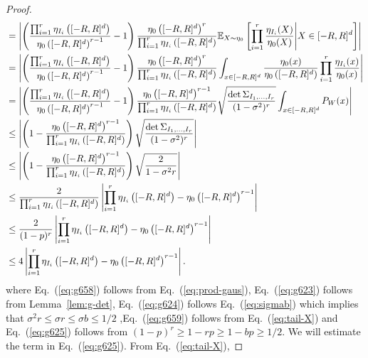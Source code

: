 \documentclass[final, 12pt]{colt2018}
\renewcommand{\eqref}[1]{Eq.~(\ref{#1})}
\begin{document}
\begin{proof}
\begin{align}
&= \left\lvert \left( \frac{\prod_{i=1}^r \eta_{I_i}\left([-R,R]^d\right)}{\eta_0\left([-R,R]^d\right)^{r-1}}-1 \right) 
\frac{\eta_0\left([-R,R]^d\right)^r}{\prod_{i=1}^r \eta_{I_i}\left([-R,R]^d\right)}
\mathbb{E}_{X\sim \eta_0}\left[ \prod_{i=1}^r \frac{\eta_{I_i}(X)}{\eta_0(X)} \middle| X \in [-R,R]^d \right] \right\rvert \notag\\
&= \left\lvert \left( \frac{\prod_{i=1}^r \eta_{I_i}\left([-R,R]^d\right)}{\eta_0\left([-R,R]^d\right)^{r-1}}-1 \right) 
\frac{\eta_0\left([-R,R]^d\right)^r}{\prod_{i=1}^r \eta_{I_i}\left([-R,R]^d\right)}
\int_{x \in [-R,R]^d} \frac{\eta_0(x)}{\eta_0\left([-R,R]^d\right)} \prod_{i=1}^r \frac{\eta_{I_i}(x)}{\eta_0(x)} \right\rvert \notag\\
&= \left\lvert \left( \frac{\prod_{i=1}^r \eta_{I_i}\left([-R,R]^d\right)}{\eta_0\left([-R,R]^d\right)^{r-1}}-1 \right) 
\frac{\eta_0\left([-R,R]^d\right)^{r-1}}{\prod_{i=1}^r \eta_{I_i}\left([-R,R]^d\right)}
\sqrt{\frac{\det \Sigma_{I_1, \dots, I_r}}{(1-\sigma^2)^r}} 
\int_{x \in [-R,R]^d} P_W(x) \right\rvert \label{eq:g658}\\
&\le\left\lvert\left(1 - \frac{\eta_0\left([-R,R]^d\right)^{r-1}}{\prod_{i=1}^r \eta_{I_i}\left([-R,R]^d\right)} \right)
\sqrt{\frac{\det \Sigma_{I_1, \dots, I_r}}{(1-\sigma^2)^r}} \right\rvert \notag\\
&\le\left\lvert\left(1 - \frac{\eta_0\left([-R,R]^d\right)^{r-1}}{\prod_{i=1}^r \eta_{I_i}\left([-R,R]^d\right)} \right)
\sqrt{\frac{2}{1-\sigma^2 r}}
\right\rvert \label{eq:g623} \\
&\le\frac{2}{\prod_{i=1}^r \eta_{I_i}\left([-R,R]^d\right)} \left\lvert \prod_{i=1}^r \eta_{I_i}\left([-R,R]^d\right) - \eta_0\left([-R,R]^d\right)^{r-1} \right\rvert
\label{eq:g624} \\
&\le \frac{2}{(1-p)^r} \left\lvert \prod_{i=1}^r \eta_{I_i}\left([-R,R]^d\right) - \eta_0\left([-R,R]^d\right)^{r-1} \right\rvert \label{eq:g659}\\
&\le 4 \left\lvert \prod_{i=1}^r \eta_{I_i}\left([-R,R]^d\right) - \eta_0\left([-R,R]^d\right)^{r-1} \right\rvert
\label{eq:g625}.
\end{align}
where \eqref{eq:g658} follows from \eqref{eq:prod-gaus}, \eqref{eq:g623} follows from Lemma~\ref{lem:g-det}, \eqref{eq:g624} follows \eqref{eq:sigmab} which implies that $\sigma^2 r \le \sigma r \le \sigma b \le 1/2$ ,\eqref{eq:g659} follows from \eqref{eq:tail-X} and \eqref{eq:g625} follows from $(1-p)^r \ge 1 - rp \ge 1 - bp \ge 1/2$. We will estimate the term in \eqref{eq:g625}. From \eqref{eq:tail-X},

\end{proof}
\end{document}
